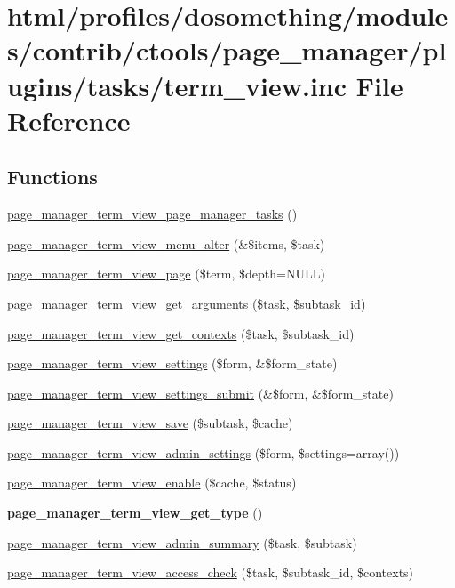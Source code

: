 \hypertarget{term__view_8inc}{
\section{html/profiles/dosomething/modules/contrib/ctools/page\_\-manager/plugins/tasks/term\_\-view.inc File Reference}
\label{term__view_8inc}
}
\subsection*{Functions}
\begin{DoxyCompactItemize}
\item 
\hyperlink{term__view_8inc_a8872873091306758d3592e1c46f8fc1f}{page\_\-manager\_\-term\_\-view\_\-page\_\-manager\_\-tasks} ()
\item 
\hyperlink{term__view_8inc_a13ed5623c41202cca6c55b80580bec5c}{page\_\-manager\_\-term\_\-view\_\-menu\_\-alter} (\&\$items, \$task)
\item 
\hyperlink{term__view_8inc_a38a32406ae3dbe2490d7176e933714f0}{page\_\-manager\_\-term\_\-view\_\-page} (\$term, \$depth=NULL)
\item 
\hyperlink{term__view_8inc_a68cce83de72cfa94323c51670b904855}{page\_\-manager\_\-term\_\-view\_\-get\_\-arguments} (\$task, \$subtask\_\-id)
\item 
\hyperlink{term__view_8inc_af4d9ba59aff95f20fa52d4a346bb7cbb}{page\_\-manager\_\-term\_\-view\_\-get\_\-contexts} (\$task, \$subtask\_\-id)
\item 
\hyperlink{term__view_8inc_a5b046bdb1844cb072960bdcd4c6e226d}{page\_\-manager\_\-term\_\-view\_\-settings} (\$form, \&\$form\_\-state)
\item 
\hyperlink{term__view_8inc_ace6e087115b02aacf749bd3871efe692}{page\_\-manager\_\-term\_\-view\_\-settings\_\-submit} (\&\$form, \&\$form\_\-state)
\item 
\hyperlink{term__view_8inc_a0577f4363ced2e8fffb582f643769e74}{page\_\-manager\_\-term\_\-view\_\-save} (\$subtask, \$cache)
\item 
\hyperlink{term__view_8inc_aea80962afc9da2471d9f4010b30d1929}{page\_\-manager\_\-term\_\-view\_\-admin\_\-settings} (\$form, \$settings=array())
\item 
\hyperlink{term__view_8inc_abdfd9eee16a69848fbc2945ef9f503b4}{page\_\-manager\_\-term\_\-view\_\-enable} (\$cache, \$status)
\item 
\hypertarget{term__view_8inc_a70594b269d407eb944694f237338bd21}{
{\bfseries page\_\-manager\_\-term\_\-view\_\-get\_\-type} ()}
\label{term__view_8inc_a70594b269d407eb944694f237338bd21}

\item 
\hyperlink{term__view_8inc_acb6720c4d438149b74241ed0be891030}{page\_\-manager\_\-term\_\-view\_\-admin\_\-summary} (\$task, \$subtask)
\item 
\hyperlink{term__view_8inc_a9ca0ff60d7d47f4dc9fbfa554948d7b1}{page\_\-manager\_\-term\_\-view\_\-access\_\-check} (\$task, \$subtask\_\-id, \$contexts)
\end{DoxyCompactItemize}


